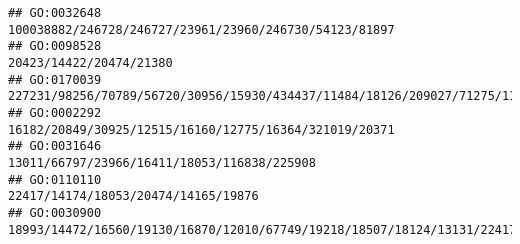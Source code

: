 \documentclass[
]{article}
\begin{document}
\begin{verbatim}
## GO:0032648                                                                                                                                                                                                                                                                                                                                                       100038882/246728/246727/23961/23960/246730/54123/81897
## GO:0098528                                                                                                                                                                                                                                                                                                                                                                                      20423/14422/20474/21380
## GO:0170039                                                                                                                                                                                                                                                                                                                             227231/98256/70789/56720/30956/15930/434437/11484/18126/209027/71275/11720/17986
## GO:0002292                                                                                                                                                                                                                                                                                                                                                       16182/20849/30925/12515/16160/12775/16364/321019/20371
## GO:0031646                                                                                                                                                                                                                                                                                                                                                                  13011/66797/23966/16411/18053/116838/225908
## GO:0110110                                                                                                                                                                                                                                                                                                                                                                          22417/14174/18053/20474/14165/19876
## GO:0030900                                                                                                                                                                                                                                               18993/14472/16560/19130/16870/12010/67749/19218/18507/18124/13131/22417/20423/21386/18506/66797/109648/12176/81907/11925/13865/14165/218772/18092/110082/19876

\end{verbatim}
\end{document}
